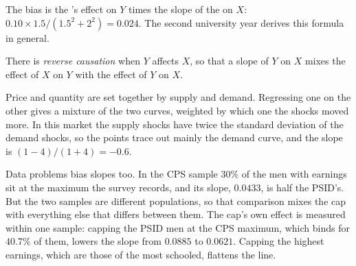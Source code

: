 The bias is the 's effect on $Y$ times the slope of the  on $X$: $0.10 \times 1.5/(1.5^2 + 2^2) = 0.024$. The second university year derives this
formula in general.

\begin{definition}\label{def:b1:simple-regression:reverse}
There is \emph{reverse causation} when $Y$ affects $X$, so that a slope of $Y$ on $X$ mixes
the effect of $X$ on $Y$ with the effect of $Y$ on $X$.
\end{definition}

\label{lst:b1:simple-regression:reverse}

\label{out:b1:simple-regression:reverse}

Price and quantity are set together by supply and demand. Regressing one on
the other gives a mixture of the two curves, weighted by which one the
shocks moved more. In this market the supply shocks have twice the standard
deviation of the demand shocks, so the points trace out mainly the demand
curve, and the slope is $(1 - 4)/(1 + 4) = -0.6$.

\label{lst:b1:simple-regression:cps}

\label{out:b1:simple-regression:cps}

Data problems bias slopes too. In the CPS sample $30\%$ of the men with
earnings sit at the maximum the survey records, and its slope, $0.0433$, is
half the PSID's. But the two samples are different populations, so that
comparison mixes the cap with everything else that differs between them.
The cap's own effect is measured within one sample: capping the PSID men at
the CPS maximum, which binds for $40.7\%$ of them, lowers the slope from
$0.0885$ to $0.0621$. Capping the highest earnings, which are those of the
most schooled, flattens the line. %

